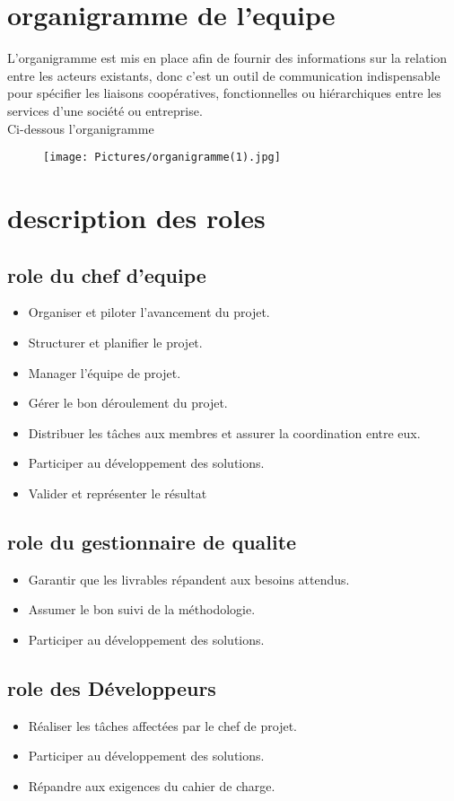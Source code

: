 \documentclass[11pt,fleqn]{book} %
\begin{document}
\section{organigramme de l'equipe}
L'organigramme est mis en place afin de fournir des informations sur la relation entre les acteurs existants, donc c’est un outil de communication indispensable pour spécifier les liaisons coopératives, fonctionnelles ou hiérarchiques entre les services d'une société ou entreprise.\\
Ci-dessous l’organigramme \\
 \begin{figure}[h]
    \centering
    \texttt{[image: Pictures/organigramme(1).jpg]}
\end{figure}
\section{description des roles}
\subsection{role du chef d'equipe}
\begin{itemize}
    \item Organiser et piloter l’avancement du projet.
    \item Structurer et planifier le projet.
    \item Manager l’équipe de projet.
   \item Gérer le bon déroulement du projet.
   \item Distribuer les tâches aux membres et assurer la coordination entre eux. 
   \item Participer au développement des solutions.
   \item Valider et représenter le résultat
\end{itemize}
\subsection{role du gestionnaire de qualite}
\begin{itemize}
    \item  Garantir que les livrables répandent aux besoins attendus.
    \item  Assumer le bon suivi de la méthodologie.
    \item  Participer au développement des solutions.
\end{itemize}
\subsection{role des Développeurs}
\begin{itemize}
    \item  Réaliser les tâches affectées par le chef de projet.
    \item  Participer au développement des solutions.
    \item  Répandre aux exigences du cahier de charge.

\end{itemize}
\newline
\newline
\end{document}

